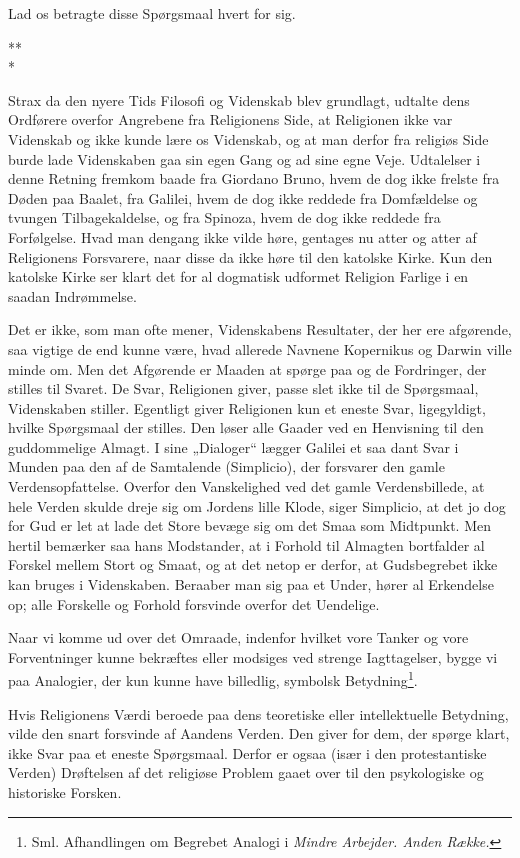 \documentclass[12pt,a4paper,openany]{book}
\newcommand{\opage}[1]{\marginnote{\footnotesize\textit{[#1]}}}
\newcommand{\stjerner}{\begin{center}*\hspace{0.4em}*\\[-0.9ex]*\end{center}}   %
\begin{document}
Lad os betragte disse Spørgsmaal hvert for sig.

\stjerner

Strax da den nyere Tids Filosofi og Videnskab blev grundlagt,
udtalte dens Ordførere overfor Angrebene fra Religionens
Side, at Religionen ikke var Videnskab og ikke kunde lære os
Videnskab, og at man derfor fra religiøs Side burde lade Videnskaben
gaa sin egen Gang og ad sine egne Veje. Udtalelser
i denne Retning fremkom baade fra Giordano Bruno,
hvem de dog ikke frelste fra Døden paa Baalet, fra Galilei,
hvem de dog ikke reddede fra Domfældelse og tvungen Tilbagekaldelse,
og fra Spinoza, hvem de dog ikke reddede fra
Forfølgelse. Hvad man dengang ikke vilde høre, gentages nu
atter og atter af Religionens Forsvarere, naar disse da ikke
høre til den katolske Kirke. Kun den katolske Kirke ser klart
det for al dogmatisk udformet Religion Farlige i en saadan
Indrømmelse.

Det er ikke, som man ofte mener, Videnskabens Resultater,
der her ere afgørende, saa vigtige de end kunne være,
hvad allerede Navnene Kopernikus og Darwin ville minde om.
Men det Afgørende er Maaden at spørge paa og de Fordringer,
der stilles til Svaret. De Svar, Religionen giver, passe slet
ikke til de Spørgsmaal, Videnskaben stiller. Egentligt giver
Religionen kun et eneste Svar, ligegyldigt, hvilke Spørgsmaal
der stilles. Den løser alle Gaader ved en Henvisning til den
guddommelige Almagt. I sine „Dialoger“ lægger Galilei et saa%
\setcounter{footnote}{0}%
\opage{14}dant Svar i Munden paa den af de Samtalende (Simplicio), der
forsvarer den gamle Verdensopfattelse. Overfor den Vanskelighed
ved det gamle Verdensbillede, at hele Verden skulde
dreje sig om Jordens lille Klode, siger Simplicio, at det jo dog
for Gud er let at lade det Store bevæge sig om det Smaa som
Midtpunkt. Men hertil bemærker saa hans Modstander, at i
Forhold til Almagten bortfalder al Forskel mellem Stort og
Smaat, og at det netop er derfor, at Gudsbegrebet ikke kan
bruges i Videnskaben. Beraaber man sig paa et Under, hører
al Erkendelse op; alle Forskelle og Forhold forsvinde overfor
det Uendelige.

Naar vi komme ud over det Omraade, indenfor hvilket
vore Tanker og vore Forventninger kunne bekræftes eller modsiges
ved strenge Iagttagelser, bygge vi paa Analogier, der kun
kunne have billedlig, symbolsk Betydning\footnote[1]{Sml. Afhandlingen om Begrebet Analogi i \textit{Mindre Arbejder. Anden Række.}}.

Hvis Religionens Værdi beroede paa dens teoretiske eller
intellektuelle Betydning, vilde den snart forsvinde af Aandens
Verden. Den giver for dem, der spørge klart, ikke Svar paa
et eneste Spørgsmaal. Derfor er ogsaa (især i den protestantiske
Verden) Drøftelsen af det religiøse Problem gaaet over
til den psykologiske og historiske Forsken.
\end{document}
